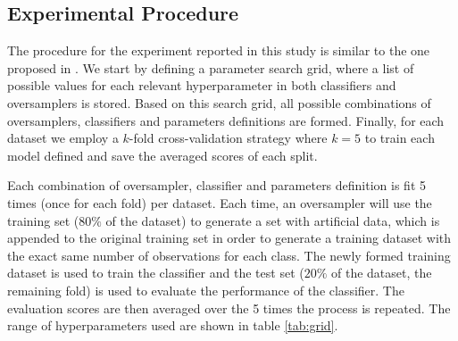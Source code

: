 \documentclass[parskip=full]{scrartcl}
\begin{document}
\subsection{Experimental Procedure}
The procedure for the experiment reported in this study is similar to the one
proposed in \cite{Douzas2019rs}. We start by defining a parameter search
grid, where a list of possible values for each relevant hyperparameter in both
classifiers and oversamplers is stored. Based on this search grid, all possible
combinations of oversamplers, classifiers and parameters definitions are
formed. Finally, for each dataset we employ a $k$-fold
cross-validation strategy where $k=5$ to train each model
defined and save the averaged scores of each split.

Each combination of oversampler, classifier and parameters definition is fit 5
times (once for each fold) per dataset. Each time, an oversampler will use the
training set ($80\%$ of the dataset) to generate a set with
artificial data, which is appended to the original training set in order to
generate a training dataset with the exact same number of observations for each
class. The newly formed training dataset is used to train the classifier and
the test set ($20\%$ of the dataset, the remaining fold) is
used to evaluate the performance of the classifier. The evaluation scores are
then averaged over the 5 times the process is repeated. The range of
hyperparameters used are shown in table \ref{tab:grid}.
\end{document}
